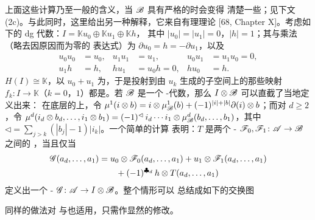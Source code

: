 \begin{remark}\label{thm:homotopy-rational-interpretation}
上面这些计算乃至一般\trHomotopy{}的含义，当 $\mathscr{B}$ 具有严格的\trIdentityMorphism{}时会变得
清楚一些；见下文 (2c)。与此同时，这里给出另一种解释，它来自有理\trHomotopy{}理论
[68, Chapter X]。考虑如下的 dg 代数：$I=\mathbb{K}u_0\oplus\mathbb{K}u_1\oplus\mathbb{K}h$，
其中 $|u_0|=|u_1|=0$，$|h|=1$；其\trDifferential{}与乘法（略去因\trDegree{}原因而为零的
表达式）为 $\partial u_0=h=-\partial u_1$，以及
\begin{equation*}
\begin{aligned}
u_0u_0&=u_0,& u_1u_1&=u_1,& u_0u_1&=u_1u_0=0,\\
u_1h&=h,& hu_1&=u_0h=0,& hu_0&=h.
\end{aligned}
\end{equation*}
$H(I)\cong\mathbb{K}$，以 $u_0+u_1$ 为\trGenerator，于是投射到由 $u_k$ 生成的子空间上的那些映射
$f_k\colon I\to\mathbb{K}$（$k=0$，$1$）都是\trQuasiisomorphism。若 $\mathscr{B}$ 是一个%
\trNonunital{}\trAinfty-代数，那么\trTensorProduct{} $I\otimes\mathscr{B}$ 可以直截了当地定义出来：
在底层\trGraded\trVectorSpace{}的\trTensorProduct{}上，令
$\mu^1(i\otimes b)=i\otimes\mu^1_{\mathscr{B}}(b)+(-1)^{|i|+|b|}\partial(i)\otimes b$；而对
$d\ge 2$，令 $\mu^d(i_d\otimes b_d,\ldots,i_1\otimes b_1)=(-1)^{\lhd}\,i_d\cdots i_1\otimes
\mu^d_{\mathscr{B}}(b_d,\ldots,b_1)$，其中 $\lhd=\sum_{j>k}(|b_j|-1)|i_k|$。一个简单的计算
表明：$T$ 是两个 \trAinfty-\trHomomorphism{} $\mathscr{F}_0,\mathscr{F}_1\colon\mathscr{A}\to\mathscr{B}$ 之间的%
\trHomotopy，当且仅当
\begin{equation*}
\begin{split}
\mathscr{G}(a_d,\ldots,a_1)
&=u_0\otimes\mathscr{F}_0(a_d,\ldots,a_1)+u_1\otimes\mathscr{F}_1(a_d,\ldots,a_1)\\
&\hspace{2em}+(-1)^{\clubsuit_d}\,h\otimes T(a_d,\ldots,a_1)
\end{split}
\end{equation*}
定义出一个 \trAinfty-\trHomomorphism{} $\mathscr{G}\colon\mathscr{A}\to I\otimes\mathscr{B}$。整个情形可以
总结成如下的交换图
同样的做法对 \trACategory{}与\trFunctor{}也适用，只需作显然的修改。
\end{remark}
